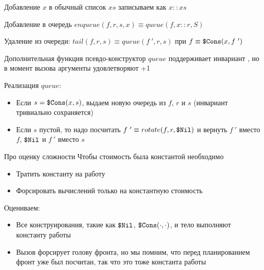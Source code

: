 \begin{frame}
\begin{notation}
Добавление $x$ в обычный список $xs$ записываем как $x::xs$
\end{notation}
Добавление в очередь $enqueue(f,r,s,x) \equiv queue(f, x::r, S) $

Удаление из очереди: $tail(f,r,s) \equiv queue(f\ ',r,s)$ при $f\equiv\texttt{\$Cons}(x,f\ ')$
\vspace{1em}

Дополнительная функция псевдо-конструктор $queue$ поддерживает инвариант \invariant, но в момент вызова аргументы удовлетворяют \invariant+1
\vspace{1em}

Реализация $queue$:
\begin{itemize}
\item Если $s=\texttt{\$Cons}(x,s)$, выдаем новую очередь из $f$, $r$ и $s$ (инвариант тривиально сохраняется)
\item Если $s$ пустой, то надо посчитать $f\ ' \equiv rotate(f,r,\texttt{\$Nil})$ и вернуть $f\ '$ вместо $f$, $\texttt{\$Nil}$ и $f\ '$ вместо $s$
\end{itemize}
\end{frame}

\begin{frame}{Про оценку сложности}
Чтобы стоимость была константой необходимо
\begin{itemize}
\item Тратить константу на работу
\item Форсировать вычислений только на константную стоимость
\end{itemize}
\vspace{1em}

Оцениваем:
\begin{itemize}
\item Все конструирования, такие как $\texttt{\$Nil}$, $\texttt{\$Cons}(\cdot,\cdot)$, и тело \rotate{} выполняют константу работы
\item Вызов \rotate{} форсирует голову фронта, но мы помним, что перед планированием \rotate{} фронт уже был посчитан, так что это тоже константа работы
\end{itemize}
\end{frame}

